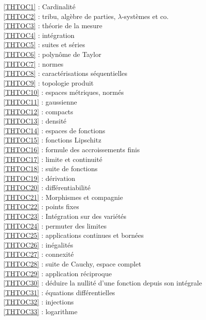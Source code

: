 \ref {THTOC1} : Cardinalité\\
\ref {THTOC2} : tribu, algèbre de parties, \( \lambda \)-systèmes et co.\\
\ref {THTOC3} : théorie de la mesure\\
\ref {THTOC4} : intégration\\
\ref {THTOC5} : suites et séries\\
\ref {THTOC6} : polynôme de Taylor\\
\ref {THTOC7} : normes\\
\ref {THTOC8} : caractérisations séquentielles\\
\ref {THTOC9} : topologie produit\\
\ref {THTOC10} : espaces métriques, normés\\
\ref {THTOC11} : gaussienne\\
\ref {THTOC12} : compacts\\
\ref {THTOC13} : densité\\
\ref {THTOC14} : espaces de fonctions\\
\ref {THTOC15} : fonctions Lipschitz\\
\ref {THTOC16} : formule des accroissements finis\\
\ref {THTOC17} : limite et continuité\\
\ref {THTOC18} : suite de fonctions\\
\ref {THTOC19} : dérivation\\
\ref {THTOC20} : différentiabilité\\
\ref {THTOC21} : Morphismes et compagnie\\
\ref {THTOC22} : points fixes\\
\ref {THTOC23} : Intégration sur des variétés\\
\ref {THTOC24} : permuter des limites\\
\ref {THTOC25} : applications continues et bornées\\
\ref {THTOC26} : inégalités\\
\ref {THTOC27} : connexité\\
\ref {THTOC28} : suite de Cauchy, espace complet\\
\ref {THTOC29} : application réciproque\\
\ref {THTOC30} : déduire la nullité d'une fonction depuis son intégrale\\
\ref {THTOC31} : équations différentielles\\
\ref {THTOC32} : injections\\
\ref {THTOC33} : logarithme\\
